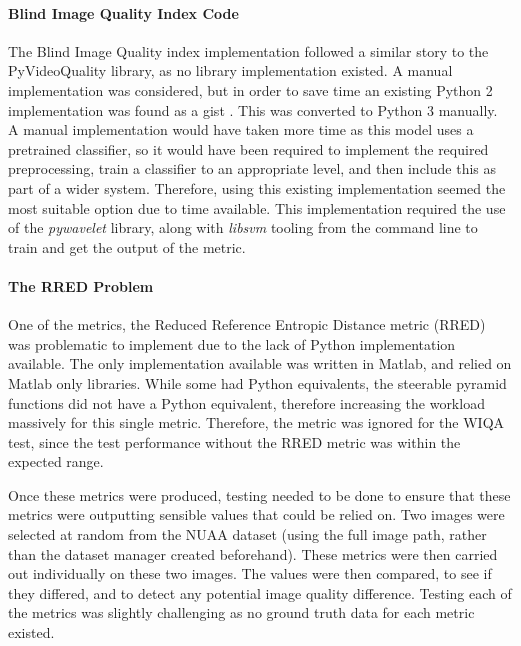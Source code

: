 \documentclass[11pt,a4paper]{article}
\begin{document}
            \paragraph{Blind Image Quality Index Code}
            The Blind Image Quality index implementation followed a similar story to the PyVideoQuality library, as no library implementation existed. A manual implementation was considered, but in order to save time an existing Python 2 implementation was found as a gist \cite{BIQIImplementation}.
            This was converted to Python 3 manually. A manual implementation would have taken more time as this model uses a pretrained classifier, so it would have been required to implement the required preprocessing, train a classifier to an appropriate level,
            and then include this as part of a wider system. Therefore, using this existing implementation seemed the most suitable option due to time available. This implementation required the use of the \emph{pywavelet} library, along with \emph{libsvm} tooling from the command line to train and get the output of the metric.


            \paragraph{The RRED Problem}
            One of the metrics, the Reduced Reference Entropic Distance metric (RRED) was problematic to implement due to the lack of Python implementation available.
            The only implementation available was written in Matlab, and relied on Matlab only libraries. While some had Python equivalents, the steerable pyramid
            functions did not have a Python equivalent, therefore increasing the workload massively for this single metric. Therefore, the metric was ignored for the WIQA
            test, since the test performance without the RRED metric was within the expected range. 
            

            Once these metrics were produced, testing needed to be done to ensure that these metrics were outputting sensible values that could be relied on.
            Two images were selected at random from the NUAA dataset (using the full image path, rather than the dataset manager created beforehand). These metrics
            were then carried out individually on these two images. The values were then compared, to see if they differed, and to detect any potential image quality difference. 
            Testing each of the metrics was slightly challenging as no ground truth data for each metric existed.
\end{document}
